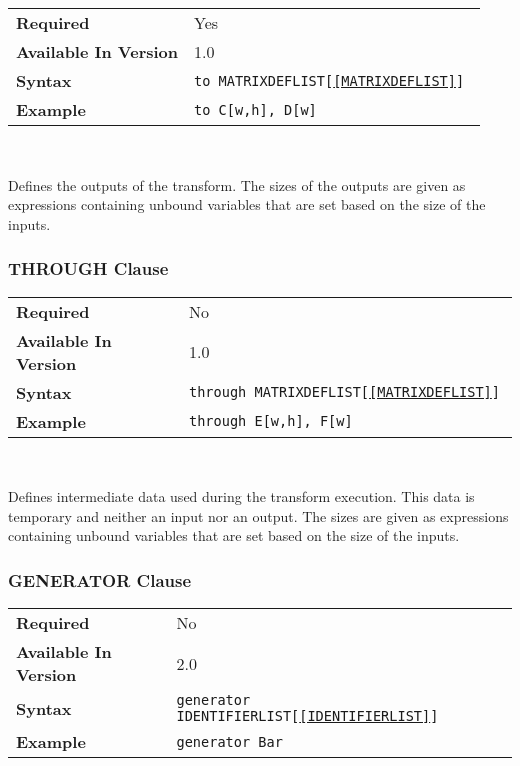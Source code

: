 \documentclass[11pt]{article}
\begin{document}
\begin{tabular}{| l | l |}
\hline
\bf Required & Yes                    \\
\bf Available In Version & 1.0        \\
\bf Syntax & \tt to MATRIXDEFLIST[\ref{MATRIXDEFLIST}]     \\
\bf Example & \tt to C[w,h], D[w]     \\
\hline
\end{tabular}

~

\noindent Defines the outputs of the transform.  The sizes of the outputs
are given as expressions containing unbound variables that are set based on the size
of the inputs.

\subsubsection{THROUGH Clause}

\begin{tabular}{| l | l |}
\hline
\bf Required & No                          \\
\bf Available In Version & 1.0             \\
\bf Syntax & \tt through MATRIXDEFLIST[\ref{MATRIXDEFLIST}]     \\
\bf Example & \tt through E[w,h], F[w]     \\
\hline
\end{tabular}

~

\noindent Defines intermediate data used during the transform execution. This
data is temporary and neither an input nor an output.  The sizes are given
as expressions containing unbound variables that are set based on the size
of the inputs.

\subsubsection{GENERATOR Clause}

\begin{tabular}{| l | l |}
\hline
\bf Required & No \\
\bf Available In Version & 2.0            \\
\bf Syntax & \tt generator IDENTIFIERLIST[\ref{IDENTIFIERLIST}]\\
\bf Example & \tt generator Bar\\
\hline
\end{tabular}
\end{document}
